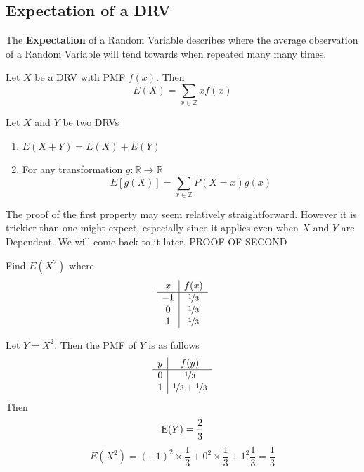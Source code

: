 \documentclass{report}
\begin{document}
\subsection{Expectation of a DRV}
\newcommand{\E}{\textup{E}}
The \textbf{Expectation} of a Random Variable describes where the average observation of a Random Variable will tend towards when repeated many many times.
\begin{definition}
Let $X$ be a DRV with PMF $f(x)$. Then
    \[
        E(X)=\sum_{x\in\mathbb Z} x f(x)
    \]
    
\end{definition}
\begin{theorem}
    Let $X$ and $Y$ be two DRVs
    \begin{enumerate}
        \item $E(X+Y)=E(X)+E(Y)$
        \item For any transformation $g:\mathbb R\to\mathbb R$
        \[
            E\left[g(X)\right] = \sum_{x\in \mathbb Z} P(X=x) g(x)
        \]
    \end{enumerate}
    The proof of the first property may seem relatively straightforward. However it is trickier than one might expect, especially since it applies even when $X$ and $Y$ are Dependent. We will come back to it later.
    \todo PROOF OF SECOND
\end{theorem}

\begin{example}
    Find $E(X^2)$ where
    \[
        \begin{array}{c|c}
             x & f(x) \\
             \hline
             -1 & \nicefrac 13\\
             0 & \nicefrac 13 \\
             1 & \nicefrac 13
        \end{array}
    \]

    Let $Y=X^2$. Then the PMF of $Y$ is as follows
    \[
        \begin{array}{c|c}
             y & f(y) \\
             \hline
             0 & \nicefrac 13 \\
             1 & \nicefrac 13 + \nicefrac 13
        \end{array}
    \]
    Then 
    \[
        \E(Y)=\frac 23
    \]
    \[
        E(X^2)=(-1)^2\times \frac 13 + 0^2\times \frac 13 + 1^2 \frac 13 = \frac 13
    \]
\end{example}
\end{document}

